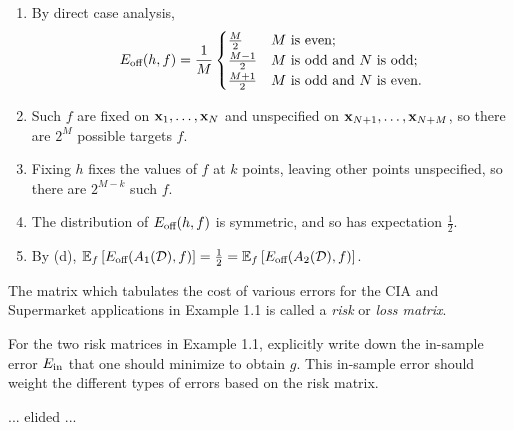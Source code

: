 \documentclass{amsart}
\begin{document}
\begin{solution}\ 
  \begin{enumerate}
    \item By direct case analysis,
      \begin{equation*}
        E_{\textup{off}}(h, f) = \frac{1}{M} \begin{cases}
          \frac{M}{2} & M \textup{ is even;} \\
          \frac{M-1}{2} & M \textup{ is odd and } N \textup{ is odd;} \\
          \frac{M+1}{2} & M \textup{ is odd and } N \textup{ is even.}
        \end{cases}
      \end{equation*}
    \item Such \(f\) are fixed on \({\bf x}_1,\ldots,{\bf x}_N\) and unspecified
      on \({\bf x}_{N+1}, \ldots, {\bf x}_{N+M}\), so there are \(2^M\) possible
      targets \(f\).
    \item Fixing \(h\) fixes the values of \(f\) at \(k\) points, leaving other
      points unspecified, so there are \(2^{M-k}\) such \(f\).
    \item The distribution of \(E_{\textup{off}}(h, f)\) is symmetric, and so
      has expectation \(\frac{1}{2}\).
    \item By (d),
      \(\mathbb{E}_f\left[E_{\textup{off}}(A_1(\mathcal{D}), f)\right] =
        \frac{1}{2}
        = \mathbb{E}_f\left[E_{\textup{off}}(A_2(\mathcal{D}), f)\right]\).
  \end{enumerate}
\end{solution}

\begin{problem}[1.11]
  The matrix which tabulates the cost of various errors for the CIA and
  Supermarket applications in Example 1.1 is called a \emph{risk} or \emph{loss
  matrix}.

  For the two risk matrices in Example 1.1, explicitly write down the in-sample
  error \(E_{\textup{in}}\) that one should minimize to obtain \(g\). This
  in-sample error should weight the different types of errors based on the risk
  matrix.
\end{problem}

\begin{solution}
  ... elided ...
\end{solution}
\end{document}
